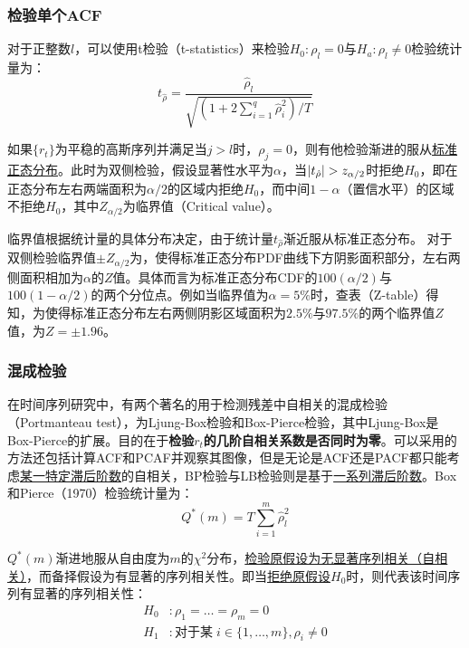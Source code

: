 \documentclass[11pt]{article}
\begin{document}
\subsubsection*{检验单个ACF}

对于正整数$l$，可以使用t检验（t-statistics）来检验$H_0: \rho_l =0$与$H_a: \rho_l \neq 0$检验统计量为：
\begin{equation*}
    t_{\hat{\rho}} = \frac{\hat{\rho}_l}{\sqrt{\left( 1+2\sum_{i=1}^{q}\hat{\rho}_i^2 \right)/T}}
\end{equation*}

如果$\{r_t\}$为平稳的高斯序列并满足当$j>l$时，$\rho_j=0$，则有他检验渐进的服从\uline{标准正态分布}。此时为双侧检验，假设显著性水平为$\alpha$，当$\left\lvert t_{\hat{\rho}}\right\rvert>z_{\alpha/2}$时拒绝$H_0$，即在正态分布左右两端面积为$\alpha/2$的区域内拒绝$H_0$，而中间$1-\alpha$（置信水平）的区域不拒绝$H_0$，其中$Z_{\alpha/2}$为临界值（Critical value）。

临界值根据统计量的具体分布决定，由于统计量$t_{\hat{\rho}}$渐近服从标准正态分布。
对于双侧检验临界值$\pm Z_{\alpha/2}$为，使得标准正态分布PDF曲线下方阴影面积部分，左右两侧面积相加为$\alpha$的$Z$值。具体而言为标准正态分布CDF的$100(\alpha/2)$与$100(1-\alpha/2)$的两个分位点。例如当临界值为$\alpha=5\%$时，查表（Z-table）得知，为使得标准正态分布左右两侧阴影区域面积为$2.5\%$与$97.5\%$的两个临界值$Z$值，为$Z=\pm 1.96$。

\subsubsection*{混成检验}

在时间序列研究中，有两个著名的用于检测残差中自相关的混成检验（Portmanteau test），为Ljung-Box检验和Box-Pierce检验，其中Ljung-Box是Box-Pierce的扩展。目的在于\textbf{检验$r_t$的几阶自相关系数是否同时为零}。可以采用的方法还包括计算ACF和PCAF并观察其图像，但是无论是ACF还是PACF都只能考虑\uline{某一特定滞后阶数}的自相关，BP检验与LB检验则是基于\uline{一系列滞后阶数}。Box和Pierce（1970）检验统计量为：
\begin{equation*}
    Q^{*}(m) = T\sum_{i=1}^{m} \hat{\rho}_{l}^{2}
\end{equation*}

$Q^{*}(m)$渐进地服从自由度为$m$的$\chi^2$分布，\uline{检验原假设为无显著序列相关（自相关）}，而备择假设为有显著的序列相关性。即当\uline{拒绝原假设}$H_0$时，则代表该时间序列有显著的序列相关性：
\begin{align*}
    H_0&: \rho_1=\dots=\rho_{m}=0 \\
    H_1&: \text{对于某}\; i \in \{1,\dots,m\},\rho_i \neq 0
\end{align*}
\end{document}
